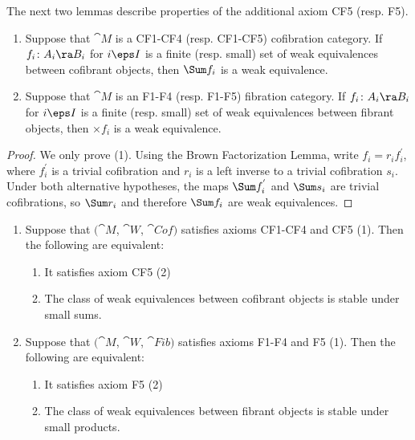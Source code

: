 The next two lemmas describe properties of the additional axiom CF5 (resp. F5).

\begin{lem}
\label{lem:smallcofsums}
\mbox{}
\begin{enumerate}
\item
Suppose that ${\cat M}$ is a CF1-CF4 (resp. CF1-CF5) cofibration category. If $f_i \colon A_i \ra B_i$ for $i \eps I$ is a finite (resp. small) set of weak equivalences between cofibrant objects, then $\Sum f_i$ is a weak equivalence.
\item
Suppose that ${\cat M}$ is an F1-F4 (resp. F1-F5) fibration category. If $f_i \colon A_i \ra B_i$ for $i \eps I$ is a finite (resp. small) set of weak equivalences between fibrant objects, then $\times f_i$ is a weak equivalence.
\end{enumerate}
\end{lem}

\begin{proof}
We only prove (1). Using the Brown Factorization Lemma, write $f_i = r_if^{'}_i $, where $f^{'}_i$ is a trivial cofibration and $r_i$ is a left inverse to a trivial cofibration $s_i$. Under both alternative hypotheses, the maps $\Sum f^{'}_i$ and $\Sum s_i$ are trivial cofibrations, so $\Sum r_i$ and therefore $\Sum f_i$ are weak equivalences.
\end{proof}

\begin{lem}
\label{lem:equivformaxiomcf5}
\mbox{}
\begin{enumerate}
\item
Suppose that $({\cat M}$, ${\cat W}$, ${\cat Cof})$ satisfies axioms CF1-CF4 and CF5 (1). Then the following are equivalent:
\begin{enumerate}
\item
It satisfies axiom CF5 (2)
\item
The class of weak equivalences between cofibrant objects is stable under small sums.
\end{enumerate}
\item
Suppose that $({\cat M}$, ${\cat W}$, ${\cat Fib})$ satisfies axioms F1-F4 and F5 (1). Then the following are equivalent:
\begin{enumerate}
\item
It satisfies axiom F5 (2)
\item
The class of weak equivalences between fibrant objects is stable under small products.
\end{enumerate}
\end{enumerate}
\end{lem}

